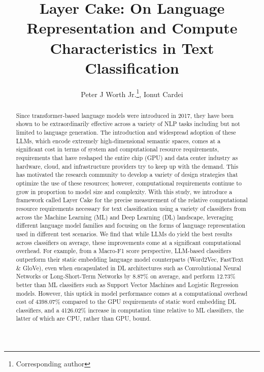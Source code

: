 \documentclass[final]{clv2025-revised}
\begin{document}
\title{Layer Cake: On Language Representation and Compute Characteristics in Text Classification}

\author{Peter J Worth Jr.\thanks{Corresponding author}, Ionut Cardei}


\maketitle

\begin{abstract}
Since transformer-based language models were introduced in 2017, they have been shown to be extraordinarily effective across a variety of NLP tasks including but not limited to language generation. The introduction and widespread adoption of these LLMs, which encode extremely high-dimensional semantic spaces, comes at a significant cost in terms of system and computational resource requirements, requirements that have reshaped the entire chip (GPU) and data center industry as hardware, cloud, and infrastructure providers try to keep up with the demand. This has motivated the research community to develop a variety of design strategies that optimize the use of these resources; however, computational requirements continue to grow in proportion to model size and complexity. With this study, we introduce a framework called Layer Cake for the precise measurement of the relative computational resource requirements necessary for text classification using a variety of classifiers from across the Machine Learning (ML) and Deep Learning (DL) landscape, leveraging different language model families and focusing on the forms of language representation used in different test scenarios. We find that while LLMs do yield the best results across classifiers on average, these improvements come at a significant computational overhead. For example, from a Macro-F1 score perspective, LLM-based classifiers outperform their static embedding language model counterparts (Word2Vec, FastText \& GloVe), even when encapsulated in DL architectures such as Convolutional Neural Networks or Long-Short-Term Networks by 8.87\% on average, and perform 12.73\% better than ML classifiers such as Support Vector Machines and Logistic Regression models. However, this uptick in model performance comes at a computational overhead cost of 4398.07\% compared to the GPU requirements of static word embedding DL classifiers, and a 4126.02\% increase in computation time relative to ML classifiers, the latter of which are CPU, rather than GPU, bound.
\end{abstract}
\end{document}
